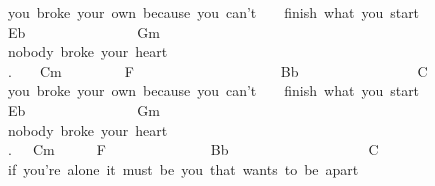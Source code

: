 {you\ broke\ your\ own\ because\ you\ can't\ \ \ \ finish\ what\ you\ start\\
Eb\ \ \ \ \ \ \ \ \ \ \ \ \ \ \ \ Gm\\
nobody\ broke\ your\ heart\\
.\ \ \ \ Cm\ \ \ \ \ \ \ \ \ F\ \ \ \ \ \ \ \ \ \ \ \ \ \ \ \ \ \ \ \ \ Bb\ \ \ \ \ \ \ \ \ \ \ \ \ \ \ \ \ C\\
you\ broke\ your\ own\ because\ you\ can't\ \ \ \ finish\ what\ you\ start\\
Eb\ \ \ \ \ \ \ \ \ \ \ \ \ \ \ \ Gm\\
nobody\ broke\ your\ heart\\
.\ \ \ Cm\ \ \ \ \ \ F\ \ \ \ \ \ \ \ \ \ \ \ \ \ \ Bb\ \ \ \ \ \ \ \ \ \ \ \ \ \ \ \ \ \ \ \ C\ \ \ \ \\
if\ you're\ alone\ it\ must\ be\ you\ that\ wants\ to\ be\ apart}
